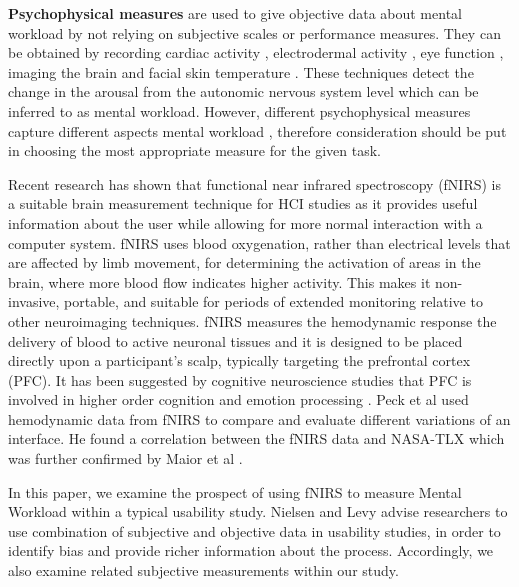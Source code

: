 \documentclass[../main/Feedback.tex]{subfiles}
\begin{document}
\textbf{Psychophysical measures} are used to give objective data about mental workload by not relying on subjective scales or performance measures.
They can be obtained by recording cardiac activity \cite{backs1994metabolic}, electrodermal activity \cite{collet2014measuring}, eye function \cite{beatty1982task}, imaging the brain \cite{balconi2015hemodynamic} and facial skin temperature \cite{stemberger2010thermal}.
These techniques detect the  change in the arousal from the autonomic nervous system level which can be inferred to as mental workload.
However, different psychophysical measures capture different aspects mental workload \cite{cain2007review}, therefore consideration should be put in choosing the most appropriate measure for the given task.

Recent research has shown that functional near infrared spectroscopy (fNIRS) is a suitable brain measurement technique for HCI studies \cite{maior2015examining,solovey2009using,pike2014measuring} as it provides useful information about the user while allowing for more normal interaction with a computer system.
fNIRS uses blood oxygenation, rather than electrical levels that are affected by limb movement, for determining the activation of areas in the brain, where more blood flow indicates higher activity.
This makes it non-invasive, portable, and suitable for periods of extended monitoring relative to other neuroimaging techniques.
fNIRS measures the hemodynamic response the delivery of blood to active neuronal tissues and it is designed to be placed directly upon a participant's scalp, typically targeting the prefrontal cortex (PFC).
It has been suggested by cognitive neuroscience studies that PFC is involved in higher order cognition \cite{braver1997parametric} and emotion processing \cite{damasio1996somatic}. Peck et al \cite{peck2013using} used hemodynamic data from fNIRS to compare and evaluate different variations of an interface.
He found a correlation between the fNIRS data and NASA-TLX which was further confirmed by Maior et al \cite{maior2014continuous}. 

In this paper, we examine the prospect of using fNIRS to measure Mental Workload within a typical usability study.
Nielsen and Levy \cite{nielsen1994measuring} advise researchers to use combination of subjective and objective data in usability studies, in order to identify bias and provide richer information about the process. Accordingly, we also examine related subjective measurements within our study.
\end{document}
